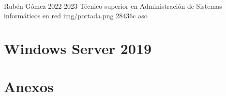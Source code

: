 \documentclass{\ClassPath/yukibook}
\begin{document}
    {Rubén Gómez}  %
    {2022-2023}    %
    {Técnico superior en Administración de \linebreak Sistemas informáticos en red} %
    {}%
    {}%
    {img/portada.png} %
    {28436c}
    {aso} %

    \coverpage
    \licensepage

    \tableofcontents


    \part{Windows Server 2019}
    \graphicspath{{../../../temas_comunes/windows_server/img/windows_server/}}
    

    \part{Anexos}
    \graphicspath{{../../../anexos/virtualbox_networking/img}}
    


    \graphicspath{{../../../anexos/gestion_backups/img/}}
    

    \graphicspath{{../../../anexos/sistemas_monitorizacion/img/}}
    
\end{document}
